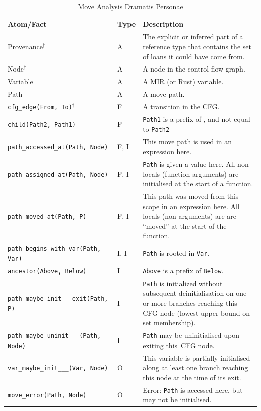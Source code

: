 \documentclass[11pt,a4paper,twoside,openany]{report}
\newcommand{\notmine}[0] {$^\dagger$}
\newcommand{\InDatalog}[1]{\texttt{#1}}
\renewcommand\_{\textunderscore\allowbreak}
\begin{document}
{ \renewcommand{\arraystretch}{1.0}
\begin{table}[!htbp]
  \begin{tabular}{@{}l l m{5.5cm}}
    Atom/Fact & Type & Description \\ \toprule
    Provenance\notmine{} & A & The explicit or inferred part of a reference type that contains the set of loans it could have come from.  \\
    Node\notmine{} & A & A node in the control-flow graph. \\
    Variable & A & A MIR (or Rust) variable. \\
    Path & A & A move path. \\
    \InDatalog{cfg_edge(From, To)}\notmine{} & F & A transition in the CFG\@. \\
    \InDatalog{child(Path2, Path1)} & F & \InDatalog{Path1} is a prefix of-, and not equal to \InDatalog{Path2}  \\
    \InDatalog{path_accessed_at(Path, Node)} & F, I & This move path is used in an expression here.\\
    \InDatalog{path_assigned_at(Path, Node)} & F, I & \InDatalog{Path} is given a value here. All non-locals (function arguments) are initialised at the start of a function.\\
    \InDatalog{path_moved_at(Path, P)} & F, I & This path was moved from this scope in an expression here. All locals (non-arguments) are are ``moved'' at the start of the function. \\
    \InDatalog{path_begins_with_var(Path, Var)} & I, I & \InDatalog{Path} is rooted in \InDatalog{Var}.\\
    \InDatalog{ancestor(Above, Below)} & I & \InDatalog{Above} is a prefix of \InDatalog{Below}.\\
    \InDatalog{path_maybe_init___exit(Path, P)} & I & \InDatalog{Path} is initialized without subsequent deinitialisation on one or more branches reaching this CFG node (lowest upper bound on set membership).\\
    \InDatalog{path_maybe_uninit___(Path, Node)} & I & \InDatalog{Path} may be uninitialised upon exiting this~CFG node. \\
    \InDatalog{var_maybe_init___(Var, Node)} & O & This variable is partially initialised along at least one branch reaching this node at the time of its exit. \\
    \InDatalog{move_error(Path, Node)} & O & Error: \InDatalog{Path} is accessed here, but may not be initialised. \\
  \end{tabular}
\caption{Move Analysis Dramatis Personae}\label{tab:move-facts-recap}
\end{table}%
}
\end{document}
